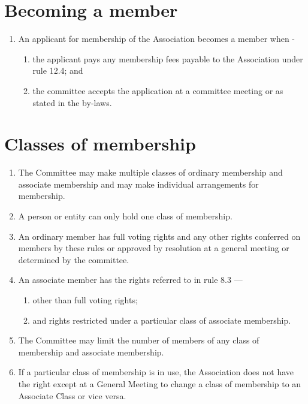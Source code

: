 \hypertarget{becoming-a-member}{%
\section{Becoming a member}\label{becoming-a-member}}

\begin{enumerate}

\item An applicant for membership of the Association becomes a member when -

  \begin{enumerate}
  
  \item the applicant pays any membership fees payable to the Association under rule 12.4; and
  \item the committee accepts the application at a committee meeting or as stated in the by-laws.
  \end{enumerate}
\end{enumerate}

\hypertarget{classes-of-membership}{%
\section{Classes of membership}\label{classes-of-membership}}

\begin{enumerate}

\item The Committee may make multiple classes of ordinary membership and associate membership and may make individual arrangements for membership.
\item A person or entity can only hold one class of membership.
\item An ordinary member has full voting rights and any other rights conferred on members by these rules or approved by resolution at a general meeting or determined by the committee.
\item An associate member has the rights referred to in rule 8.3 ---

  \begin{enumerate}
  
  \item other than full voting rights;
  \item and rights restricted under a particular class of associate membership.
  \end{enumerate}
\item The Committee may limit the number of members of any class of membership and associate membership.
\item If a particular class of membership is in use, the Association does not have the right except at a General Meeting to change a class of membership to an Associate Class or vice versa.
\end{enumerate}

